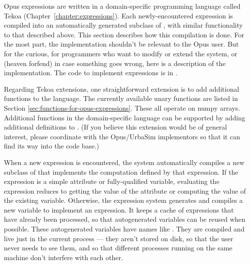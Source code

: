 Opus expressions are written in a domain-specific programming language called Tekoa
(Chapter~\ref{chapter:expressions}).  Each newly-encountered expression is compiled into
an automatically generated subclass of , with similar functionality
to that described above.  This section describes how this compilation is done.
For the most part, the implementation shouldn't be relevant
to the Opus user.  But for the curious, for programmers who want to modify or extend
the system, or (heaven forfend) in case something goes wrong, here is a
description of the implementation.  The code to implement expressions is in
.  

Regarding Tekoa extensions, one straightforward extension is to add additional 
functions to the language.  The currently available unary functions are 
listed in Section \ref{sec:functions-for-opus-expressions}.  These all operate 
on numpy arrays.  Additional functions in the domain-specific
language can be supported by adding additional definitions to 
.  (If you believe this extension would
be of general interest, please coordinate with the Opus/UrbaSim implementors
so that it can find its way into the code base.)

When a new expression is encountered, the system automatically compiles a
new subclass of  that implements the computation defined by
that expression.  If the expression is a simple attribute or
fully-qualified variable, evaluating the expression reduces to getting the
value of the attribute or computing the value of the existing
variable. Otherwise, the expression system generates and compiles a new
variable to implement an expression. It keeps a cache of expressions that
have already been processed, so that autogenerated variables can be reused
when possible. These autogenerated variables have names like
. They are compiled and live just in the current
process --- they aren't stored on disk, so that the user never needs to see
them, and so that different processes running on the same machine don't
interfere with each other.

